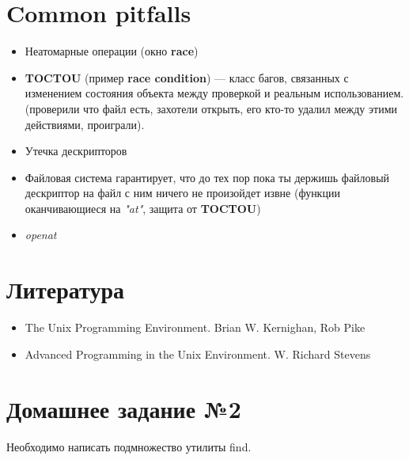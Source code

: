 \documentclass[../../lectures.tex]{subfiles}
\begin{document}
\section{Common pitfalls}
\begin{itemize}
    \item Неатомарные операции (окно \textbf{race})
    \item \textbf{TOCTOU} (пример \textbf{race condition}) --- класс багов, связанных
          с изменением состояния объекта между проверкой и реальным использованием.
          (проверили что файл есть, захотели открыть, его кто-то удалил между этими действиями,
          проиграли).
    \item Утечка дескрипторов
    \item Файловая система гарантирует, что до тех пор пока 
          ты держишь файловый дескриптор на файл с ним ничего 
          не произойдет извне (функции оканчивающиеся на \emph{"at"}, 
          защита от \textbf{TOCTOU})
    \item \emph{openat}
\end{itemize}

\newpage
\section{Литература}
\begin{itemize}
    \item The Unix Programming Environment. Brian W. Kernighan, Rob Pike
    \item Advanced Programming in the Unix Environment. W. Richard Stevens
\end{itemize}

\section{Домашнее задание №2}
Необходимо написать подмножество утилиты find.
\end{document}
